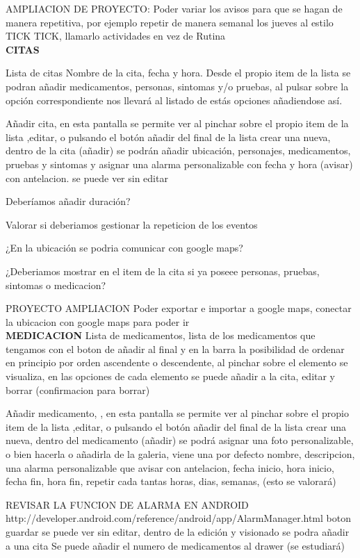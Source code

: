 \documentclass[../pfc.tex]{subfiles}
\begin{document}
	AMPLIACION DE PROYECTO: Poder variar los avisos para que se hagan de manera repetitiva, por ejemplo repetir de manera semanal los jueves al estilo TICK TICK, llamarlo actividades en vez de Rutina\\ 
	

	\textbf{CITAS}
	
	Lista de citas Nombre de la cita, fecha y hora.
	Desde el propio item de la lista se podran añadir medicamentos, personas, sintomas y/o pruebas, al pulsar sobre la opción correspondiente nos llevará al listado de estás opciones añadiendose así.
	
	Añadir cita, en esta pantalla se permite ver al pinchar sobre el propio item de la lista ,editar, o pulsando el botón añadir del final de la lista crear una nueva, 
	dentro de la cita (añadir) se podrán añadir ubicación, personajes, medicamentos, pruebas y sintomas y asignar una alarma personalizable con fecha y hora (avisar) con antelacion.
	se puede ver sin editar
	
	Deberíamos añadir duración?
	
	Valorar si deberiamos gestionar la repeticion de los eventos
	
	¿En la ubicación se podria comunicar con google maps?
	
	¿Deberiamos mostrar en el item de la cita si ya poseee personas, pruebas, sintomas o medicacion?
	
	PROYECTO AMPLIACION Poder exportar e importar a google maps, conectar la ubicacion con google maps para poder ir\\
	
	
	\textbf{MEDICACION}
	Lista de medicamentos, lista de los medicamentos que tengamos con el boton de añadir al final y en la barra la posibilidad de ordenar en principio por orden ascendente o descendente,
	al pinchar sobre el elemento se visualiza, en las opciones de cada elemento se puede añadir a la cita, editar y borrar (confirmacion para borrar)
	
	Añadir medicamento, , en esta pantalla se permite ver al pinchar sobre el propio item de la lista ,editar, o pulsando el botón añadir del final de la lista crear una nueva, 
	dentro del medicamento (añadir) se podrá asignar una foto personalizable, o bien hacerla o añadirla de la galeria, viene una por defecto
	nombre, descripcion, 
	una alarma personalizable que avisar con antelacion, fecha inicio, hora inicio, fecha fin, hora fin, repetir cada tantas horas, dias, semanas, (esto se valorará)

	REVISAR LA FUNCION DE ALARMA EN ANDROID http://developer.android.com/reference/android/app/AlarmManager.html
	boton guardar 
	se puede ver sin editar, 
	dentro de la edición y visionado se podra añadir a una cita
	Se puede añadir el numero de medicamentos al drawer (se estudiará)
	
\end{document}
